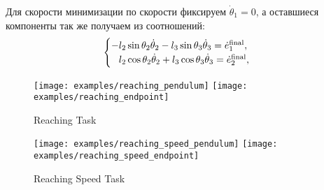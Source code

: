 \documentclass[../../doc.tex]{subfiles}
\begin{document}
    Для скорости минимизации по скорости фиксируем $\dot \theta_1 = 0$, а оставшиеся компоненты так же получаем из соотношений:
    \begin{equation*}
        \begin{cases}
            - l_2 \sin \theta_2 \dot \theta_2 - l_3 \sin \theta_3 \dot \theta_3 = \dot e_1^{\textnormal{final}},
            \\
            \hphantom{-} l_2 \cos \theta_2 \dot \theta_2 + l_3 \cos \theta_3 \dot \theta_3 = \dot e_2^{\textnormal{final}},
        \end{cases}
    \end{equation*}

    \begin{figure}[h]
        \begin{center}
            \texttt{[image: examples/reaching\_pendulum]}
            \texttt{[image: examples/reaching\_endpoint]}
        \end{center}
        \caption{Reaching Task}
    \end{figure}

    \begin{figure}[h]
        \begin{center}
            \texttt{[image: examples/reaching\_speed\_pendulum]}
            \texttt{[image: examples/reaching\_speed\_endpoint]}
        \end{center}
        \caption{Reaching Speed Task}
    \end{figure}

    \ifSubfilesClassLoaded{
        \nocite{*}
        \clearpage
        
        
    }{}
\end{document}
